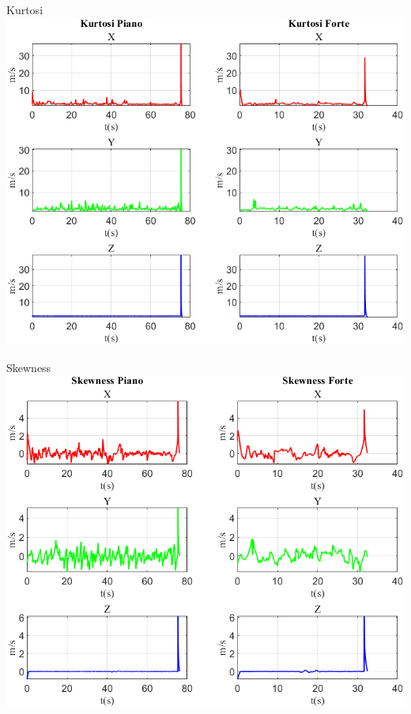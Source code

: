 	\begin{frame}{{Kurtosi}}
		\centering\includegraphics[height=.8\textheight]{figure/Vel/Kurtosi}
	\end{frame}
	
	\begin{frame}{{Skewness}}
		\centering\includegraphics[height=.8\textheight]{figure/Vel/Skewness}
	\end{frame}
	
